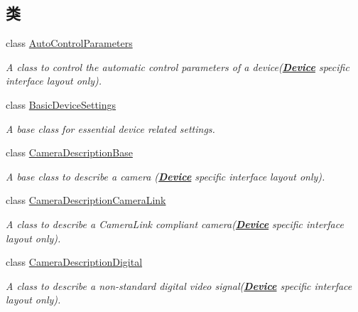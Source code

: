 \subsection*{类}
\begin{DoxyCompactItemize}
\item 
class \hyperlink{classmv_i_m_p_a_c_t_1_1acquire_1_1_auto_control_parameters}{Auto\+Control\+Parameters}
\begin{DoxyCompactList}\small\item\em A class to control the automatic control parameters of a device({\bfseries \hyperlink{classmv_i_m_p_a_c_t_1_1acquire_1_1_device}{Device}} specific interface layout only). \end{DoxyCompactList}\item 
class \hyperlink{classmv_i_m_p_a_c_t_1_1acquire_1_1_basic_device_settings}{Basic\+Device\+Settings}
\begin{DoxyCompactList}\small\item\em A base class for essential device related settings. \end{DoxyCompactList}\item 
class \hyperlink{classmv_i_m_p_a_c_t_1_1acquire_1_1_camera_description_base}{Camera\+Description\+Base}
\begin{DoxyCompactList}\small\item\em A base class to describe a camera ({\bfseries \hyperlink{classmv_i_m_p_a_c_t_1_1acquire_1_1_device}{Device}} specific interface layout only). \end{DoxyCompactList}\item 
class \hyperlink{classmv_i_m_p_a_c_t_1_1acquire_1_1_camera_description_camera_link}{Camera\+Description\+Camera\+Link}
\begin{DoxyCompactList}\small\item\em A class to describe a Camera\+Link\textregistered{} compliant camera({\bfseries \hyperlink{classmv_i_m_p_a_c_t_1_1acquire_1_1_device}{Device}} specific interface layout only). \end{DoxyCompactList}\item 
class \hyperlink{classmv_i_m_p_a_c_t_1_1acquire_1_1_camera_description_digital}{Camera\+Description\+Digital}
\begin{DoxyCompactList}\small\item\em A class to describe a non-\/standard digital video signal({\bfseries \hyperlink{classmv_i_m_p_a_c_t_1_1acquire_1_1_device}{Device}} specific interface layout only). \end{DoxyCompactList}\item 

\end{DoxyCompactItemize}
